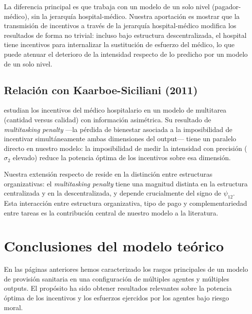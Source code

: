 La diferencia principal es que \citet{eggleston2005} trabaja con un modelo de un solo nivel (pagador-médico), sin la jerarquía hospital-médico. Nuestra aportación es mostrar que la transmisión de incentivos a través de la jerarquía hospital-médico modifica los resultados de forma no trivial: incluso bajo estructura descentralizada, el hospital tiene incentivos para internalizar la sustitución de esfuerzo del médico, lo que puede atenuar el deterioro de la intensidad respecto de lo predicho por un modelo de un solo nivel.

\subsection{Relación con Kaarboe-Siciliani (2011)}

\citet{kaarboe2011} estudian los incentivos del médico hospitalario en un modelo de multitarea (cantidad versus calidad) con información asimétrica. Su resultado de \textit{multitasking penalty} ---la pérdida de bienestar asociada a la imposibilidad de incentivar simultáneamente ambas dimensiones del output--- tiene un paralelo directo en nuestro modelo: la imposibilidad de medir la intensidad con precisión ($\sigma_2$ elevado) reduce la potencia óptima de los incentivos sobre esa dimensión.

Nuestra extensión respecto de \citet{kaarboe2011} reside en la distinción entre estructuras organizativas: el \textit{multitasking penalty} tiene una magnitud distinta en la estructura centralizada y en la descentralizada, y depende crucialmente del signo de $\psi_{12}$. Esta interacción entre estructura organizativa, tipo de pago y complementariedad entre tareas es la contribución central de nuestro modelo a la literatura.

\section{Conclusiones del modelo teórico}
\label{sec:conclusiones_modelo}

En las páginas anteriores hemos caracterizado los rasgos principales de un modelo de provisión sanitaria en una configuración de múltiples agentes y múltiples outputs. El propósito ha sido obtener resultados relevantes sobre la potencia óptima de los incentivos y los esfuerzos ejercidos por los agentes bajo riesgo moral.

